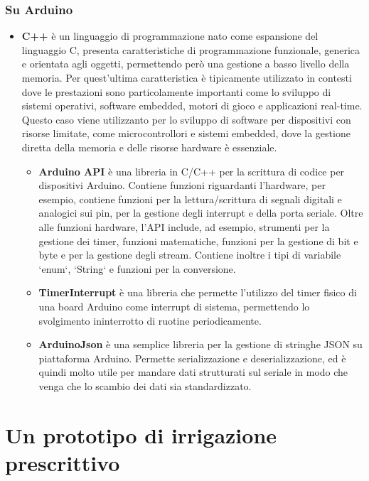 \documentclass[12pt,a4paper,openright,twoside]{book}
\begin{document}
\subsection{Su Arduino}
\begin{itemize}
    \item \textbf{C++} è un linguaggio di programmazione nato come espansione del linguaggio C, presenta caratteristiche di programmazione funzionale, generica e orientata agli oggetti, permettendo però una gestione a basso livello della memoria. Per quest'ultima caratteristica è tipicamente utilizzato in contesti dove le prestazioni sono particolamente importanti come lo sviluppo di sistemi operativi, software embedded, motori di gioco e applicazioni real-time. Questo caso viene utilizzanto per lo sviluppo di software per dispositivi con risorse limitate, come microcontrollori e sistemi embedded, dove la gestione diretta della memoria e delle risorse hardware è essenziale.
    \begin{itemize}[noitemsep]
        \item \textbf{Arduino API} è una libreria in C/C++ per la scrittura di codice per dispositivi Arduino. Contiene funzioni riguardanti l'hardware, per esempio, contiene funzioni per la lettura/scrittura di segnali digitali e analogici sui pin, per la gestione degli interrupt e della porta seriale. Oltre alle funzioni hardware, l'API include, ad esempio, strumenti per la gestione dei timer, funzioni matematiche, funzioni per la gestione di bit e byte e per la gestione degli stream. Contiene inoltre i tipi di variabile `enum`, `String` e funzioni per la conversione.
        \item \textbf{TimerInterrupt} è una libreria che permette l'utilizzo del timer fisico di una board Arduino come interrupt di sistema, permettendo lo svolgimento ininterrotto di ruotine periodicamente.
        \item \textbf{ArduinoJson} è una semplice libreria per la gestione di stringhe JSON su piattaforma Arduino. Permette serializzazione e deserializzazione, ed è quindi molto utile per mandare dati strutturati sul seriale in modo che venga che lo scambio dei dati sia standardizzato.
    \end{itemize}
\end{itemize}

\chapter{Un prototipo di irrigazione prescrittivo}\label{capitolo-3}
\end{document}
